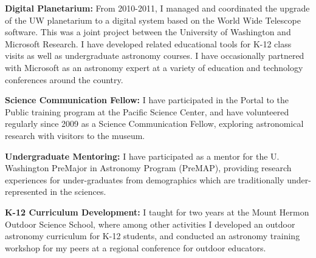 \listing
{\bf Digital Planetarium:} From 2010-2011, I managed and coordinated the upgrade of the UW planetarium to a digital system based on the World Wide Telescope software. This was a joint project between the University of Washington and Microsoft Research. I have developed related educational tools for K-12 class visits as well as undergraduate astronomy courses. I have occasionally partnered with Microsoft as an astronomy expert at a variety of education and technology conferences around the country.

\listing
{\bf Science Communication Fellow:} I have participated in the Portal to the Public training program at the Paciﬁc Science Center, and have volunteered regularly since 2009 as a Science Communication Fellow, exploring astronomical research with visitors to the museum.

\listing
{\bf Undergraduate Mentoring:} I have participated as a mentor for the U. Washington PreMajor in Astronomy Program (PreMAP), providing research experiences for under-graduates from demographics which are traditionally under-represented in the sciences.

\listing
{\bf K-12 Curriculum Development:} I taught for two years at the Mount Hermon Outdoor Science School, where among other activities I developed an outdoor astronomy curriculum for K-12 students, and conducted an astronomy training workshop for my peers at a regional conference for outdoor educators.


